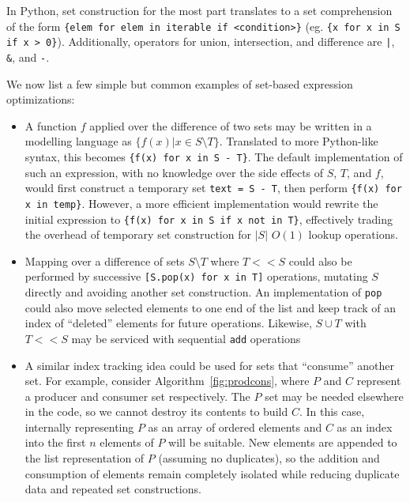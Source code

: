 \documentclass{article}
\begin{document}
In Python, set construction for the most part translates to a set comprehension of the form \texttt{\{elem for elem in iterable if <condition>\}} (eg. \texttt{\{x for x in S if x > 0\}}). Additionally, operators for union, intersection, and difference are \texttt{|}, \texttt{\&}, and \texttt{-}.

We now list a few simple but common examples of set-based expression optimizations:
\begin{itemize}
  \item A function $f$ applied over the difference of two sets may be written in a modelling language as $\{f(x) | x \in S \setminus T\}$. Translated to more Python-like syntax, this becomes \texttt{\{f(x) for x in S - T\}}. The default implementation of such an expression, with no knowledge over the side effects of $S$, $T$, and $f$, would first construct a temporary set \texttt{text = S - T}, then perform \texttt{\{f(x) for x in temp\}}. However, a more efficient implementation would rewrite the initial expression to \texttt{\{f(x) for x in S if x not in T\}}, effectively trading the overhead of temporary set construction for $|S|$ $O(1)$ lookup operations.
  \item Mapping over a difference of sets $S \setminus T$ where $T << S$ could also be performed by successive \texttt{[S.pop(x) for x in T]} operations, mutating $S$ directly and avoiding another set construction. An implementation of \texttt{pop} could also move selected elements to one end of the list and keep track of an index of ``deleted'' elements for future operations. Likewise, $S \cup T$ with $T << S$ may be serviced with sequential \texttt{add} operations
  \item A similar index tracking idea could be used for sets that ``consume'' another set. For example, consider Algorithm~\ref{fig:prodcons}, where $P$ and $C$ represent a producer and consumer set respectively. The $P$ set may be needed elsewhere in the code, so we cannot destroy its contents to build $C$. In this case, internally representing $P$ as an array of ordered elements and $C$ as an index into the first $n$ elements of $P$ will be suitable. New elements are appended to the list representation of $P$ (assuming no duplicates), so the addition and consumption of elements remain completely isolated while reducing duplicate data and repeated set constructions.

\end{itemize}
\end{document}
